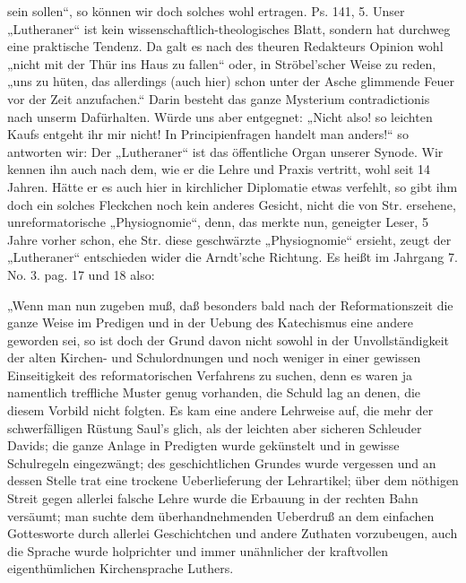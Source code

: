 sein sollen“, so können wir doch solches wohl ertragen. Ps. 141, 5. Unser „Lutheraner“ ist kein
wissenschaftlich-theologisches Blatt, sondern hat durchweg eine praktische Tendenz. Da galt es nach des
theuren Redakteurs Opinion wohl „nicht mit der Thür ins Haus zu fallen“ oder, in Ströbel’scher
Weise zu reden, „uns zu hüten, das allerdings (auch hier) schon unter der Asche glimmende Feuer vor der
Zeit anzufachen.“ Darin besteht das ganze Mysterium contradictionis nach unserm Dafürhalten. Würde
uns aber entgegnet: „Nicht also! so leichten Kaufs entgeht ihr mir nicht! In Principienfragen handelt
man anders!“ so antworten wir: Der „Lutheraner“ ist das öffentliche Organ unserer Synode. Wir
kennen ihn auch nach dem, wie er die Lehre und Praxis vertritt, wohl
seit 14 Jahren. Hätte er es auch hier in kirchlicher Diplomatie etwas verfehlt, so gibt
ihm doch ein solches Fleckchen noch kein anderes Gesicht, nicht die von Str. ersehene, unreformatorische
„Physiognomie“, denn, das merkte nun, geneigter Leser, 5 Jahre vorher schon, ehe Str. diese geschwärzte
„Physiognomie“ ersieht, zeugt der „Lutheraner“ entschieden wider die Arndt’sche Richtung. Es
heißt im Jahrgang 7. No. 3. pag. 17 und 18 also:

„Wenn man nun zugeben muß, daß besonders bald nach der Reformationszeit die ganze Weise im Predigen
und in der Uebung des Katechismus eine andere geworden sei, so ist doch der Grund davon nicht sowohl in der
Unvollständigkeit der alten Kirchen- und Schulordnungen und noch weniger in einer gewissen Einseitigkeit
des reformatorischen Verfahrens zu suchen, denn es waren ja namentlich treffliche Muster genug vorhanden,
die Schuld lag an denen, die diesem Vorbild nicht folgten. Es kam eine andere Lehrweise auf, die mehr
der schwerfälligen Rüstung Saul’s glich, als der leichten aber sicheren Schleuder Davids; die ganze
Anlage in Predigten wurde gekünstelt und in gewisse Schulregeln eingezwängt; des geschichtlichen
Grundes wurde vergessen und an dessen Stelle trat eine trockene Ueberlieferung der Lehrartikel; über
dem nöthigen Streit gegen allerlei falsche Lehre wurde die Erbauung in der rechten Bahn versäumt; man
suchte dem überhandnehmenden Ueberdruß an dem einfachen Gottesworte durch allerlei Geschichtchen und
andere Zuthaten vorzubeugen, auch die Sprache wurde holprichter und immer unähnlicher der kraftvollen
eigenthümlichen Kirchensprache Luthers.

